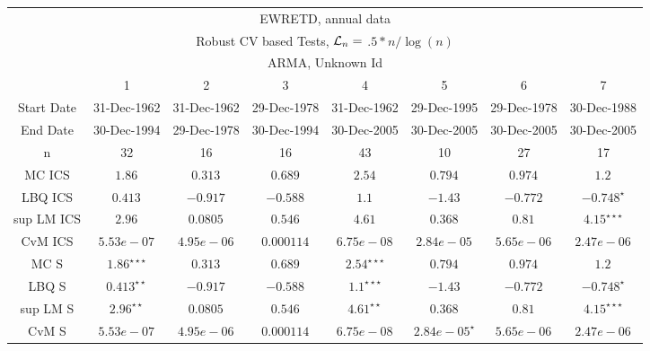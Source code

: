  \begin{table}[H] 
 \tiny 
 \centering 
\begin{tabular}{|c|c|c|c|c|c|c|c|} 
\multicolumn{8}{c}{ EWRETD, annual data } \\ 
\multicolumn{8}{c}{ Robust CV based Tests, $\mathcal{L}_n =$ $.5*n/\log(n)$ } \\ 
\multicolumn{8}{c}{ ARMA, Unknown Id } \\ 
 \hline 
 &  1  &  2  &  3  &  4  &  5  &  6  &  7    \\ 
 Start Date &  31-Dec-1962 &  31-Dec-1962 &  29-Dec-1978 &  31-Dec-1962 &  29-Dec-1995 &  29-Dec-1978 &  30-Dec-1988 \\ 
 End Date &  30-Dec-1994 &  29-Dec-1978 &  30-Dec-1994 &  30-Dec-2005 &  30-Dec-2005 &  30-Dec-2005 &  30-Dec-2005 \\ 
 n &   32  &   16  &   16  &   43  &   10  &   27  &   17  \\ 
 \hline 
 MC ICS &   $ 1.86^{} $  &   $ 0.313^{} $  &   $ 0.689^{} $  &   $ 2.54^{} $  &   $ 0.794^{} $  &   $ 0.974^{} $  &   $ 1.2^{} $  \\ 
 LBQ ICS &   $ 0.413^{} $  &   $ -0.917^{} $  &   $ -0.588^{} $  &   $ 1.1^{} $  &   $ -1.43^{} $  &   $ -0.772^{} $  &   $ -0.748^{\star } $  \\ 
 sup LM ICS &   $ 2.96^{} $  &   $ 0.0805^{} $  &   $ 0.546^{} $  &   $ 4.61^{} $  &   $ 0.368^{} $  &   $ 0.81^{} $  &   $ 4.15^{\star \star \star } $  \\ 
 CvM ICS &   $ 5.53e-07^{} $  &   $ 4.95e-06^{} $  &   $ 0.000114^{} $  &   $ 6.75e-08^{} $  &   $ 2.84e-05^{} $  &   $ 5.65e-06^{} $  &   $ 2.47e-06^{} $  \\ 
 \hline 
 MC S &   $ 1.86^{\star \star \star } $  &   $ 0.313^{} $  &   $ 0.689^{} $  &   $ 2.54^{\star \star \star } $  &   $ 0.794^{} $  &   $ 0.974^{} $  &   $ 1.2^{} $  \\ 
 LBQ S &   $ 0.413^{\star \star } $  &   $ -0.917^{} $  &   $ -0.588^{} $  &   $ 1.1^{\star \star \star } $  &   $ -1.43^{} $  &   $ -0.772^{} $  &   $ -0.748^{\star } $  \\ 
 sup LM S &   $ 2.96^{\star \star } $  &   $ 0.0805^{} $  &   $ 0.546^{} $  &   $ 4.61^{\star \star } $  &   $ 0.368^{} $  &   $ 0.81^{} $  &   $ 4.15^{\star \star \star } $  \\ 
 CvM S &   $ 5.53e-07^{} $  &   $ 4.95e-06^{} $  &   $ 0.000114^{} $  &   $ 6.75e-08^{} $  &   $ 2.84e-05^{\star } $  &   $ 5.65e-06^{} $  &   $ 2.47e-06^{} $  \\ 
 \hline 
\end{tabular}
 \end{table}
